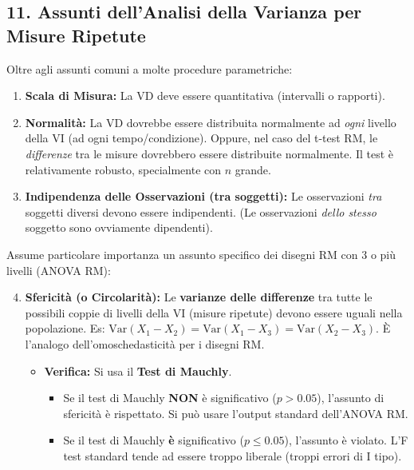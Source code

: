\documentclass[12pt, a4paper]{article}
\begin{document}
\subsection*{11. Assunti dell'Analisi della Varianza per Misure Ripetute}
Oltre agli assunti comuni a molte procedure parametriche:
\begin{enumerate}
    \item \textbf{Scala di Misura:} La VD deve essere quantitativa (intervalli o rapporti).
    \item \textbf{Normalità:} La VD dovrebbe essere distribuita normalmente ad \textit{ogni} livello della VI (ad ogni tempo/condizione). Oppure, nel caso del t-test RM, le \textit{differenze} tra le misure dovrebbero essere distribuite normalmente. Il test è relativamente robusto, specialmente con $n$ grande.
    \item \textbf{Indipendenza delle Osservazioni (tra soggetti):} Le osservazioni \textit{tra} soggetti diversi devono essere indipendenti. (Le osservazioni \textit{dello stesso} soggetto sono ovviamente dipendenti).
\end{enumerate}
Assume particolare importanza un assunto specifico dei disegni RM con 3 o più livelli (ANOVA RM):
\begin{enumerate}
    \setcounter{enumi}{3}
    \item \textbf{Sfericità (o Circolarità):} Le \textbf{varianze delle differenze} tra tutte le possibili coppie di livelli della VI (misure ripetute) devono essere uguali nella popolazione. Es: $\text{Var}(X_1-X_2) = \text{Var}(X_1-X_3) = \text{Var}(X_2-X_3)$. È l'analogo dell'omoschedasticità per i disegni RM.
        \begin{itemize}
            \item \textbf{Verifica:} Si usa il \textbf{Test di Mauchly}.
            \begin{itemize}
                \item Se il test di Mauchly \textbf{NON} è significativo ($p > 0.05$), l'assunto di sfericità è rispettato. Si può usare l'output standard dell'ANOVA RM.
                \item Se il test di Mauchly \textbf{è} significativo ($p \le 0.05$), l'assunto è violato. L'F test standard tende ad essere troppo liberale (troppi errori di I tipo).
            \end{itemize}
      
        \end{itemize}
\end{enumerate}
\end{document}
